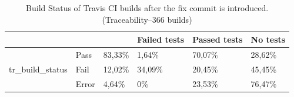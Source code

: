 \documentclass[10pt,conference]{IEEEtran}
\begin{document}
\begin{table}[t]
\centering
\begin{tabular}{lll|lll}
\hline
\multicolumn{3}{l|}{}                                & Failed tests & Passed tests & No tests \\ \hline
\multirow{3}{*}{tr\_build\_status} & Pass  & 83,33\% & 1,64\%       & 70,07\%      & 28,62\%  \\
                                   & Fail  & 12,02\% & 34,09\%      & 20,45\%      & 45,45\%  \\
                                   & Error & 4,64\%  & 0\%          & 23,53\%      & 76,47\%  \\ \hline
\end{tabular}
\caption{Build Status of Travis CI builds after the fix commit is introduced. \\ (Traceability--366 builds)}
\label{tab:afterfix}
\end{table}
\end{document}
